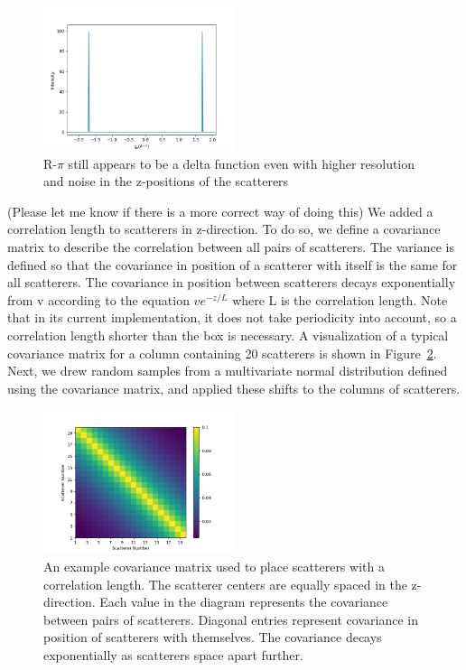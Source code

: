 \documentclass{article}
\begin{document}
  \begin{figure}[!htb]
  \centering
  \includegraphics[width=0.5\textwidth]{tall_rpi.png}
  \caption{R-$\pi$ still appears to be a delta function even with higher resolution and
  noise in the z-positions of the scatterers}\label{fig:tall_rpi}
  \end{figure}

  (Please let me know if there is a more correct way of doing this)
  We added a correlation length to scatterers in z-direction. To do so, we
  define a covariance matrix to describe the correlation between all pairs of
  scatterers. The variance is defined so that the covariance in position of
  a scatterer with itself is the same for all scatterers. The covariance in
  position between scatterers decays exponentially from v according to the
  equation $ve^{-z/L}$ where L is the correlation length. Note that in its
  current implementation, it does not take periodicity into account, so a
  correlation length shorter than the box is necessary. A visualization of a
  typical covariance matrix for a column containing 20 scatterers is shown in
  Figure~\ref{fig:covariance}. Next, we drew random samples from a multivariate
  normal distribution defined using the covariance matrix, and applied these
  shifts to the columns of scatterers.

  \begin{figure}[!htb]
  \centering
  \includegraphics[width=0.5\textwidth]{covariance.png}
  \caption{An example covariance matrix used to place scatterers with a
	  correlation length. The scatterer centers are equally spaced in the
	  z-direction. Each value in the diagram represents the covariance between pairs
	  of scatterers. Diagonal entries represent covariance in position of scatterers
	  with themselves. The covariance decays exponentially as scatterers space apart
	  further.}\label{fig:covariance}
  \end{figure}
\end{document}
